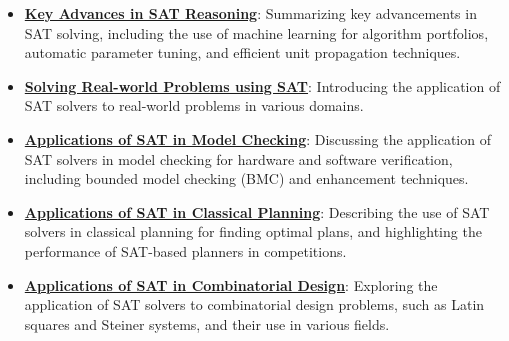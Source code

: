 \documentclass{article}%
\begin{document}
\begin{itemize}[leftmargin=*]
\item \href{https://purdue.brightspace.com/d2l/common/assets/pdfjs-d2l-dist/1.0.14-legacy/web/viewer.html?file=\%2Fcontent\%2Fenforced\%2F1095467-wl.202510.CS.24300.001\%2F15L2-SAT.pdf\%3Fou\%3D1095467\&lang=en-us\&container=d2l-fileviewer-rendered-pdf\&fullscreen=d2l-fileviewer-rendered-pdf-dialog\&height=667#page=35}{\textbf{Key Advances in SAT Reasoning}}: Summarizing key advancements in SAT solving, including the use of machine learning for algorithm portfolios, automatic parameter tuning, and efficient unit propagation techniques.%
\item \href{https://purdue.brightspace.com/d2l/common/assets/pdfjs-d2l-dist/1.0.14-legacy/web/viewer.html?file=\%2Fcontent\%2Fenforced\%2F1095467-wl.202510.CS.24300.001\%2F15L2-SAT.pdf\%3Fou\%3D1095467\&lang=en-us\&container=d2l-fileviewer-rendered-pdf\&fullscreen=d2l-fileviewer-rendered-pdf-dialog\&height=667#page=37}{\textbf{Solving Real-world Problems using SAT}}: Introducing the application of SAT solvers to real-world problems in various domains.%
\item \href{https://purdue.brightspace.com/d2l/common/assets/pdfjs-d2l-dist/1.0.14-legacy/web/viewer.html?file=\%2Fcontent\%2Fenforced\%2F1095467-wl.202510.CS.24300.001\%2F15L2-SAT.pdf\%3Fou\%3D1095467\&lang=en-us\&container=d2l-fileviewer-rendered-pdf\&fullscreen=d2l-fileviewer-rendered-pdf-dialog\&height=667#page=51}{\textbf{Applications of SAT in Model Checking}}: Discussing the application of SAT solvers in model checking for hardware and software verification, including bounded model checking (BMC) and enhancement techniques.%
\item \href{https://purdue.brightspace.com/d2l/common/assets/pdfjs-d2l-dist/1.0.14-legacy/web/viewer.html?file=\%2Fcontent\%2Fenforced\%2F1095467-wl.202510.CS.24300.001\%2F15L2-SAT.pdf\%3Fou\%3D1095467\&lang=en-us\&container=d2l-fileviewer-rendered-pdf\&fullscreen=d2l-fileviewer-rendered-pdf-dialog\&height=667#page=52}{\textbf{Applications of SAT in Classical Planning}}: Describing the use of SAT solvers in classical planning for finding optimal plans, and highlighting the performance of SAT-based planners in competitions.%
\item \href{https://purdue.brightspace.com/d2l/common/assets/pdfjs-d2l-dist/1.0.14-legacy/web/viewer.html?file=\%2Fcontent\%2Fenforced\%2F1095467-wl.202510.CS.24300.001\%2F15L2-SAT.pdf\%3Fou\%3D1095467\&lang=en-us\&container=d2l-fileviewer-rendered-pdf\&fullscreen=d2l-fileviewer-rendered-pdf-dialog\&height=667#page=53}{\textbf{Applications of SAT in Combinatorial Design}}: Exploring the application of SAT solvers to combinatorial design problems, such as Latin squares and Steiner systems, and their use in various fields.%

\end{itemize}
\end{document}
